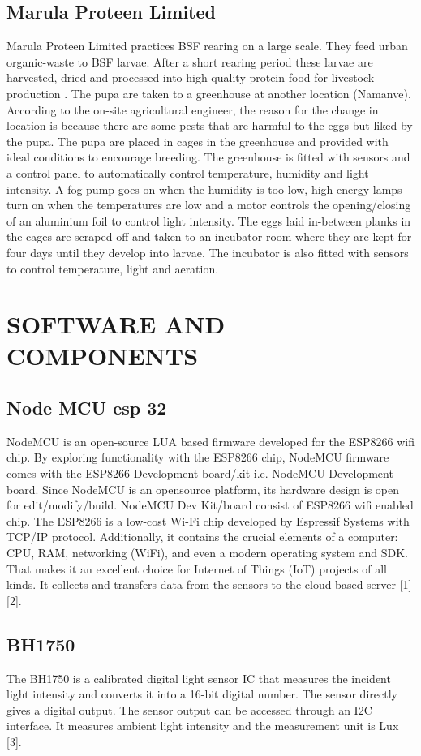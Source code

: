 \documentclass[conference]{IEEEtran}
\begin{document}
\subsection{Marula Proteen Limited}
Marula Proteen Limited practices BSF rearing on a large scale. They feed urban organic-waste to
BSF larvae. After a short rearing period these larvae are harvested, dried and processed into high
quality protein food for livestock production \cite{b1}. The pupa are taken to a greenhouse at another
location (Namanve). According to the on-site agricultural engineer, the reason for the change in
location is because there are some pests that are harmful to the eggs but liked by the pupa. The
pupa are placed in cages in the greenhouse and provided with ideal conditions to encourage
breeding. The greenhouse is fitted with sensors and a control panel to automatically control
temperature, humidity and light intensity. A fog pump goes on when the humidity is too low, high
energy lamps turn on when the temperatures are low and a motor controls the opening/closing of
an aluminium foil to control light intensity. The eggs laid in-between planks in the cages are
scraped off and taken to an incubator room where they are kept for four days until they develop
into larvae. The incubator is also fitted with sensors to control temperature, light and aeration.

\section{SOFTWARE AND COMPONENTS}
\subsection{Node MCU esp 32}
NodeMCU is an open-source LUA based firmware developed for the ESP8266 wifi chip. By
exploring functionality with the ESP8266 chip, NodeMCU firmware comes with the ESP8266
Development board/kit i.e. NodeMCU Development board. Since NodeMCU is an opensource platform, its hardware design is open for edit/modify/build. NodeMCU Dev Kit/board
consist of ESP8266 wifi enabled chip. The ESP8266 is a low-cost Wi-Fi chip developed by
Espressif Systems with TCP/IP protocol. Additionally, it contains the crucial elements of a
computer: CPU, RAM, networking (WiFi), and even a modern operating system and SDK.
That makes it an excellent choice for Internet of Things (IoT) projects of all kinds. It collects
and transfers data from the sensors to the cloud based server [1] [2].
\subsection{BH1750}
The BH1750 is a calibrated digital light sensor IC that measures the incident light intensity and
converts it into a 16-bit digital number. The sensor directly gives a digital output. The sensor
output can be accessed through an I2C interface. It measures ambient light intensity and the
measurement unit is Lux [3].
\end{document}

